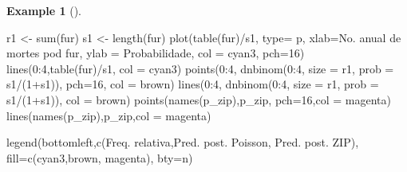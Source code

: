 \documentclass[
  letterpaper,
  DIV=11,
  numbers=noendperiod]{scrreprt}
\newenvironment{Shaded}{\begin{snugshade}}{\end{snugshade}}
\newcommand{\AttributeTok}[1]{\textcolor[rgb]{0.40,0.45,0.13}{#1}}
\newcommand{\DecValTok}[1]{\textcolor[rgb]{0.68,0.00,0.00}{#1}}
\newcommand{\FunctionTok}[1]{\textcolor[rgb]{0.28,0.35,0.67}{#1}}
\newcommand{\NormalTok}[1]{\textcolor[rgb]{0.00,0.23,0.31}{#1}}
\newcommand{\OtherTok}[1]{\textcolor[rgb]{0.00,0.23,0.31}{#1}}
\newcommand{\SpecialCharTok}[1]{\textcolor[rgb]{0.37,0.37,0.37}{#1}}
\newcommand{\StringTok}[1]{\textcolor[rgb]{0.13,0.47,0.30}{#1}}
\theoremstyle{definition}
\theoremstyle{plain}
\theoremstyle{definition}
\newtheorem{example}{Example}[chapter]
\theoremstyle{remark}
\begin{document}
\begin{example}[]
\begin{Shaded}
\begin{Highlighting}[]
\NormalTok{r1 }\OtherTok{\textless{}{-}} \FunctionTok{sum}\NormalTok{(fur)}
\NormalTok{s1 }\OtherTok{\textless{}{-}} \FunctionTok{length}\NormalTok{(fur)}
\FunctionTok{plot}\NormalTok{(}\FunctionTok{table}\NormalTok{(fur)}\SpecialCharTok{/}\NormalTok{s1, }\AttributeTok{type=} \StringTok{\textquotesingle{}p\textquotesingle{}}\NormalTok{, }\AttributeTok{xlab=}\StringTok{\textquotesingle{}No. anual de mortes pod fur\textquotesingle{}}\NormalTok{, }\AttributeTok{ylab =} \StringTok{\textquotesingle{}Probabilidade\textquotesingle{}}\NormalTok{, }\AttributeTok{col =} \StringTok{\textquotesingle{}cyan3\textquotesingle{}}\NormalTok{, }\AttributeTok{pch=}\DecValTok{16}\NormalTok{)}
\FunctionTok{lines}\NormalTok{(}\DecValTok{0}\SpecialCharTok{:}\DecValTok{4}\NormalTok{,}\FunctionTok{table}\NormalTok{(fur)}\SpecialCharTok{/}\NormalTok{s1, }\AttributeTok{col =} \StringTok{\textquotesingle{}cyan3\textquotesingle{}}\NormalTok{)}
\FunctionTok{points}\NormalTok{(}\DecValTok{0}\SpecialCharTok{:}\DecValTok{4}\NormalTok{, }\FunctionTok{dnbinom}\NormalTok{(}\DecValTok{0}\SpecialCharTok{:}\DecValTok{4}\NormalTok{, }\AttributeTok{size =}\NormalTok{ r1, }\AttributeTok{prob =}\NormalTok{ s1}\SpecialCharTok{/}\NormalTok{(}\DecValTok{1}\SpecialCharTok{+}\NormalTok{s1)), }\AttributeTok{pch=}\DecValTok{16}\NormalTok{, }\AttributeTok{col =} \StringTok{\textquotesingle{}brown\textquotesingle{}}\NormalTok{)}
\FunctionTok{lines}\NormalTok{(}\DecValTok{0}\SpecialCharTok{:}\DecValTok{4}\NormalTok{, }\FunctionTok{dnbinom}\NormalTok{(}\DecValTok{0}\SpecialCharTok{:}\DecValTok{4}\NormalTok{, }\AttributeTok{size =}\NormalTok{ r1, }\AttributeTok{prob =}\NormalTok{ s1}\SpecialCharTok{/}\NormalTok{(}\DecValTok{1}\SpecialCharTok{+}\NormalTok{s1)), }\AttributeTok{col =} \StringTok{\textquotesingle{}brown\textquotesingle{}}\NormalTok{)}
\FunctionTok{points}\NormalTok{(}\FunctionTok{names}\NormalTok{(p\_zip),p\_zip, }\AttributeTok{pch=}\DecValTok{16}\NormalTok{,}\AttributeTok{col =} \StringTok{\textquotesingle{}magenta\textquotesingle{}}\NormalTok{)}
\FunctionTok{lines}\NormalTok{(}\FunctionTok{names}\NormalTok{(p\_zip),p\_zip,}\AttributeTok{col =} \StringTok{\textquotesingle{}magenta\textquotesingle{}}\NormalTok{)}

\FunctionTok{legend}\NormalTok{(}\StringTok{\textquotesingle{}bottomleft\textquotesingle{}}\NormalTok{,}\FunctionTok{c}\NormalTok{(}\StringTok{\textquotesingle{}Freq. relativa\textquotesingle{}}\NormalTok{,}\StringTok{\textquotesingle{}Pred. post. Poisson\textquotesingle{}}\NormalTok{, }\StringTok{\textquotesingle{}Pred. post. ZIP\textquotesingle{}}\NormalTok{), }\AttributeTok{fill=}\FunctionTok{c}\NormalTok{(}\StringTok{\textquotesingle{}cyan3\textquotesingle{}}\NormalTok{,}\StringTok{\textquotesingle{}brown\textquotesingle{}}\NormalTok{, }\StringTok{\textquotesingle{}magenta\textquotesingle{}}\NormalTok{), }\AttributeTok{bty=}\StringTok{\textquotesingle{}n\textquotesingle{}}\NormalTok{)}
\end{Highlighting}
\end{Shaded}


\end{example}
\end{document}
